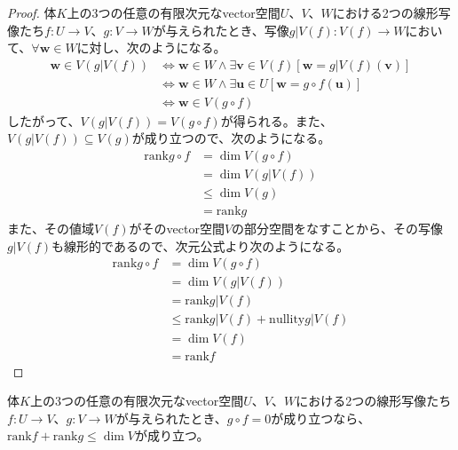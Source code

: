 \documentclass[dvipdfmx]{jsarticle}
\begin{document}
\begin{proof}
体$K$上の3つの任意の有限次元なvector空間$U$、$V$、$W$における2つの線形写像たち$f:U \rightarrow V$、$g:V \rightarrow W$が与えられたとき、写像$g|V(f):V(f) \rightarrow W$において、$\forall\mathbf{w} \in W$に対し、次のようになる。
\begin{align*}
\mathbf{w} \in V\left( g|V(f) \right) &\Leftrightarrow \mathbf{w} \in W \land \exists\mathbf{v} \in V(f)\left\lbrack \mathbf{w} = g|V(f)\left( \mathbf{v} \right) \right\rbrack\\
&\Leftrightarrow \mathbf{w} \in W \land \exists\mathbf{u} \in U\left\lbrack \mathbf{w} = g \circ f\left( \mathbf{u} \right) \right\rbrack\\
&\Leftrightarrow \mathbf{w} \in V(g \circ f)
\end{align*}
したがって、$V\left( g|V(f) \right) = V(g \circ f)$が得られる。また、$V\left( g|V(f) \right) \subseteq V(g)$が成り立つので、次のようになる。
\begin{align*}
{\mathrm{rank}}{g \circ f} &= \dim{V(g \circ f)}\\
&= \dim{V\left( g|V(f) \right)}\\
&\leq \dim{V(g)}\\
&= {\mathrm{rank}}g
\end{align*}
また、その値域$V(f)$がそのvector空間$V$の部分空間をなすことから、その写像$g|V(f)$も線形的であるので、次元公式より次のようになる。
\begin{align*}
{\mathrm{rank}}{g \circ f} &= \dim{V(g \circ f)}\\
&= \dim{V\left( g|V(f) \right)}\\
&= {\mathrm{rank}}{g|V(f)}\\
&\leq {\mathrm{rank}}{g|V(f)} + {\mathrm{nullity}}{g|V(f)}\\
&= \dim{V(f)}\\
&= {\mathrm{rank}}f
\end{align*}
\end{proof}
\begin{thm}\label{2.1.2.17}
体$K$上の3つの任意の有限次元なvector空間$U$、$V$、$W$における2つの線形写像たち$f:U \rightarrow V$、$g:V \rightarrow W$が与えられたとき、$g \circ f = 0$が成り立つなら、${\mathrm{rank}}f + {\mathrm{rank}}g \leq \dim V$が成り立つ。
\end{thm}
\end{document}
